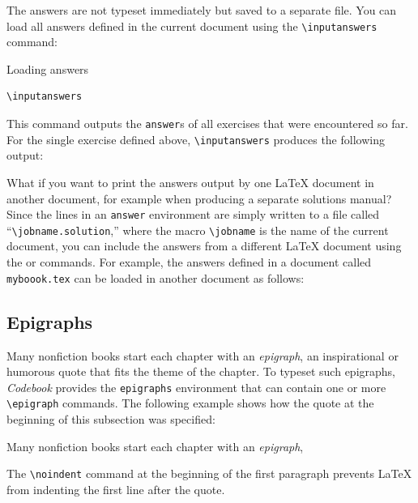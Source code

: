 \documentclass[minted]{codebook}
\begin{document}
The answers are not typeset immediately but saved to a separate file.
You can load all answers defined in the current document using the \verb|\inputanswers| command:
\begin{lst*}{Loading answers}
\begin{verbatim}
\inputanswers
\end{verbatim}
\end{lst*}
This command outputs the \verb|answer|s of all exercises that were encountered so far.
For the single exercise defined above, \verb|\inputanswers| produces the following output:

What if you want to print the answers output by one \LaTeX{} document in another document, for example when producing a separate solutions manual?
Since the lines in an \verb|answer| environment are simply written to a file called ``\verb|\jobname.solution|,'' where the macro \verb|\jobname| is the name of the current document, you can include the answers from a different \LaTeX{} document using the \verb|| or \verb|| commands.
For example, the answers defined in a document called \verb|myboook.tex| can be loaded in another document as follows:
\begin{texcode}

\end{texcode}


\subsection{Epigraphs}


\noindent Many nonfiction books start each chapter with an \emph{epigraph},
an inspirational or humorous quote that fits the theme of the chapter.
To typeset such epigraphs, \emph{Codebook} provides the \verb|epigraphs| environment that can contain one or more \verb|\epigraph| commands.
The following example shows how the quote at the beginning of this subsection was specified:
\begin{texcode}
\noindent Many nonfiction books start each chapter with an \emph{epigraph},
\end{texcode}
The \verb|\noindent| command at the beginning of the first paragraph prevents \LaTeX{} from indenting the first line after the quote.
\end{document}

